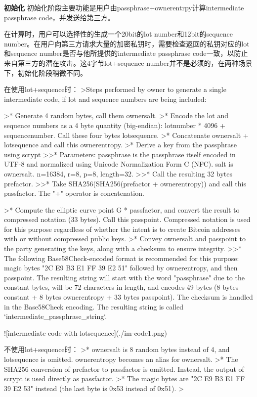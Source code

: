 \documentclass{article}
\begin{document}
\textbf{ 初始化}
初始化阶段主要功能是用户由passphrase+ownerentrpy计算intermediate passphrase code，并发送给第三方。  

在计算时，用户可以选择性的生成一个20bit的lot number和12bit的sequence number。在用户向第三方请求大量的加密私钥时，需要检查返回的私钥对应的lot和sequence number是否与他所提供的intermediate passphrase code一致，以防止来自第三方的潜在攻击。这4字节lot+sequence number并不是必须的，在两种场景下，初始化阶段稍微不同。 
 
在使用lot+sequence时：  
>Steps performed by owner to generate a single intermediate code, if lot and sequence numbers are being included:  

>* Generate 4 random bytes, call them ownersalt.
>* Encode the lot and sequence numbers as a 4 byte quantity (big-endian): lotnumber * 4096 + sequencenumber. Call these four bytes lotsequence.
>* Concatenate ownersalt + lotsequence and call this ownerentropy.
>* Derive a key from the passphrase using scrypt  
>>* Parameters: passphrase is the passphrase itself encoded in UTF-8 and normalized using Unicode Normalization Form C (NFC). salt is ownersalt. n=16384, r=8, p=8, length=32.
>>* Call the resulting 32 bytes prefactor.
>>* Take SHA256(SHA256(prefactor + ownerentropy)) and call this passfactor. The "+" operator is concatenation.  

>* Compute the elliptic curve point G * passfactor, and convert the result to compressed notation (33 bytes). Call this passpoint. Compressed notation is used for this purpose regardless of whether the intent is to create Bitcoin addresses with or without compressed public keys.
>* Convey ownersalt and passpoint to the party generating the keys, along with a checksum to ensure integrity.    
>>* The following Base58Check-encoded format is recommended for this purpose: magic bytes "2C E9 B3 E1 FF 39 E2 51" followed by ownerentropy, and then passpoint. The resulting string will start with the word "passphrase" due to the constant bytes, will be 72 characters in length, and encodes 49 bytes (8 bytes constant + 8 bytes ownerentropy + 33 bytes passpoint). The checksum is handled in the Base58Check encoding. The resulting string is called `intermediate_passphrase_string`.

![intermediate code with lotsequence](./im-code1.png)

不使用lot+sequence时：
>* ownersalt is 8 random bytes instead of 4, and lotsequence is omitted. ownerentropy becomes an alias for ownersalt.
>* The SHA256 conversion of prefactor to passfactor is omitted. Instead, the output of scrypt is used directly as passfactor.
>* The magic bytes are "2C E9 B3 E1 FF 39 E2 53" instead (the last byte is 0x53 instead of 0x51).
>
\end{document}
